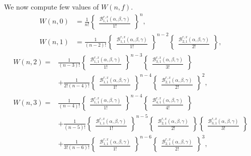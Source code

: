 \documentclass[12pt]{amsart}
\newtheorem{proof 1}{proof 1}
\begin{document}
We now compute few values of $W(n,f)$.
\begin{align*}W(n,0)&=\frac{1}{n!}\begin{Bmatrix}\frac{\mathcal{B}^{r,x}_{1,1}(\alpha,\beta,\gamma)}{1!}\end{Bmatrix}^{n},\\
W(n,1)&=\frac{1}{(n-2)!}\begin{Bmatrix}\frac{\mathcal{B}^{r,x}_{1,1}(\alpha,\beta,\gamma)}{1!}\end{Bmatrix}^{n-2}\begin{Bmatrix}\frac{\mathcal{B}^{r,x}_{2,1}(\alpha,\beta,\gamma)}{2!}\end{Bmatrix},\end{align*}
\begin{align*}
W(n,2)=&\frac{1}{(n-3)!}\begin{Bmatrix}\frac{\mathcal{B}^{r,x}_{1,1}(\alpha,\beta,\gamma)}{1!}\end{Bmatrix}^{n-3}\begin{Bmatrix}\frac{\mathcal{B}^{r,x}_{3,1}(\alpha,\beta,\gamma)}{3!}\end{Bmatrix}\\&+\frac{1}{2!(n-4)!}\begin{Bmatrix}\frac{\mathcal{B}^{r,x}_{1,1}(\alpha,\beta,\gamma)}{1!}\end{Bmatrix}^{n-4}\begin{Bmatrix}\frac{\mathcal{B}^{r,x}_{2,1}(\alpha,\beta,\gamma)}{2!}\end{Bmatrix}^2,\\
	W(n,3)=&\frac{1}{(n-4)!}\begin{Bmatrix}
		\frac{\mathcal{B}^{r,x}_{1,1}(\alpha,\beta,\gamma)}{1!}
	\end{Bmatrix}^{n-4}\begin{Bmatrix}
		\frac{\mathcal{B}^{r,x}_{4,1}(\alpha,\beta,\gamma)}{4!}
	\end{Bmatrix}\\&+\frac{1}{(n-5)!}\begin{Bmatrix}
		\frac{\mathcal{B}^{r,x}_{1,1}(\alpha,\beta,\gamma)}{1!}
	\end{Bmatrix}^{n-5}\begin{Bmatrix}
		\frac{\mathcal{B}^{r,x}_{2,1}(\alpha,\beta,\gamma)}{2!}
	\end{Bmatrix}\begin{Bmatrix}
		\frac{\mathcal{B}^{r,x}_{3,1}(\alpha,\beta,\gamma)}{3!}
	\end{Bmatrix}\\&+\frac{1}{3!(n-6)!}\begin{Bmatrix}
		\frac{\mathcal{B}^{r,x}_{1,1}(\alpha,\beta,\gamma)}{1!}
	\end{Bmatrix}^{n-6}\begin{Bmatrix}
		\frac{\mathcal{B}^{r,x}_{2,1}(\alpha,\beta,\gamma)}{2!}
	\end{Bmatrix}^3,
\end{align*}
\end{document}
